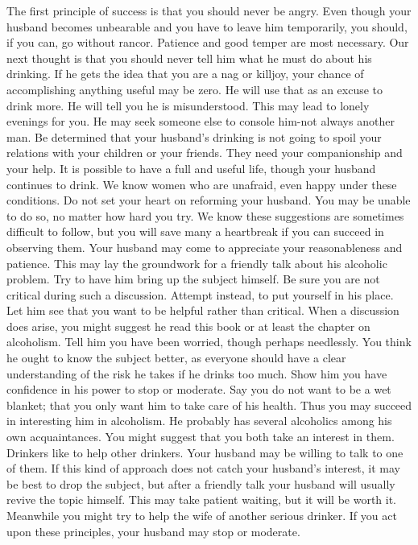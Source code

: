 \begin{biblechapter}
The first principle of success is that you should never be angry.  Even though your husband becomes unbearable and you have to leave him temporarily, you should, if you can, go without rancor.  Patience and good temper are most necessary.
Our next thought is that you should never tell him what he must do about his drinking.  If he gets the idea that you are a nag or killjoy, your chance of accomplishing anything useful may be zero.  He will use that as an excuse to drink more.  He will tell you he is misunderstood.  This may lead to lonely evenings for you.  He may seek someone else to console him-not always another man.
Be determined that your husband's drinking is not going to spoil your relations with your children or your friends.  They need your companionship and your help.  It is possible to have a full and useful life, though your husband continues to drink.  We know women who are unafraid, even happy under these conditions.  Do not set your heart on reforming your husband.  You may be unable to do so, no matter how hard you try.
We know these suggestions are sometimes difficult to follow, but you will save many a heartbreak if you can succeed in observing them.  Your husband may come to appreciate your reasonableness and patience.  This may lay the groundwork for a friendly talk about his alcoholic problem.  Try to have him bring up the subject himself.  Be sure you are not critical during such a discussion.  Attempt instead, to put yourself in his place.  Let him see that you want to be helpful rather than critical.
When a discussion does arise, you might suggest he read this book or at least the chapter on alcoholism.  Tell him you have been worried, though perhaps needlessly.  You think he ought to know the subject better, as everyone should have a clear understanding of the risk he takes if he drinks too much.  Show him you have confidence in his power to stop or moderate.  Say you do not want to be a wet blanket; that you only want him to take care of his health.  Thus you may succeed in interesting him in alcoholism.
He probably has several alcoholics among his own acquaintances.  You might suggest that you both take an interest in them.  Drinkers like to help other drinkers.  Your husband may be willing to talk to one of them.
If this kind of approach does not catch your husband's interest, it may be best to drop the subject, but after a friendly talk your husband will usually revive the topic himself.  This may take patient waiting, but it will be worth it.  Meanwhile you might try to help the wife of another serious drinker.  If you act upon these principles, your husband may stop or moderate.

\end{biblechapter}
